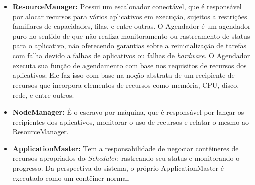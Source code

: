 \begin{itemize}

\item \textbf{ResourceManager:}
Possui um escalonador conectável, que é responsável por alocar recursos para vários aplicativos em execução, sujeitos a restrições familiares de capacidades, filas, e entre outras. O Agendador é um agendador puro no sentido de que não realiza monitoramento ou rastreamento de status para o aplicativo, não oferecendo garantias sobre a reinicialização de tarefas com falha devido a falhas de aplicativos ou falhas de \textit{hardware}. O Agendador executa sua função de agendamento com base nos requisitos de recursos dos aplicativos; Ele faz isso com base na noção abstrata de um recipiente de recursos que incorpora elementos de recursos como memória, CPU, disco, rede, e entre outros.

\item \textbf{NodeManager:}
É o escravo por máquina, que é responsável por lançar os recipientes dos aplicativos, monitorar o uso de recursos e relatar o mesmo ao ResourceManager.

\item \textbf{ApplicationMaster:}
Tem a responsabilidade de negociar contêineres de recursos apropriados do \textit{Scheduler}, rastreando seu status e monitorando o progresso. Da perspectiva do sistema, o próprio ApplicationMaster é executado como um contêiner normal.

\end{itemize}


